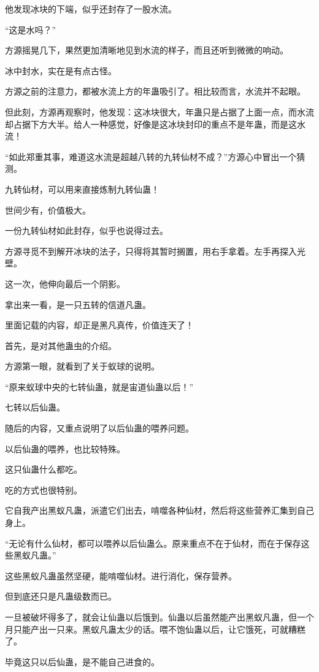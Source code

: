 \begin{this_body}
他发现冰块的下端，似乎还封存了一股水流。

“这是水吗？”

方源摇晃几下，果然更加清晰地见到水流的样子，而且还听到微微的响动。

冰中封水，实在是有点古怪。

方源之前的注意力，都被水流上方的年蛊吸引了。相比较而言，水流并不起眼。

但此刻，方源再观察时，他发现：这冰块很大，年蛊只是占据了上面一点，而水流却占据下方大半。给人一种感觉，好像是这冰块封印的重点不是年蛊，而是这水流！

“如此郑重其事，难道这水流是超越八转的九转仙材不成？”方源心中冒出一个猜测。

九转仙材，可以用来直接炼制九转仙蛊！

世间少有，价值极大。

一份九转仙材如此封存，似乎也说得过去。

方源寻觅不到解开冰块的法子，只得将其暂时搁置，用右手拿着。左手再探入光壁。

这一次，他伸向最后一个阴影。

拿出来一看，是一只五转的信道凡蛊。

里面记载的内容，却正是黑凡真传，价值连天了！

首先，是对其他蛊虫的介绍。

方源第一眼，就看到了关于蚁球的说明。

“原来蚁球中央的七转仙蛊，就是宙道仙蛊以后！”

七转以后仙蛊。

随后的内容，又重点说明了以后仙蛊的喂养问题。

以后仙蛊的喂养，也比较特殊。

这只仙蛊什么都吃。

吃的方式也很特别。

它自我产出黑蚁凡蛊，派遣它们出去，啃噬各种仙材，然后将这些营养汇集到自己身上。

“无论有什么仙材，都可以喂养以后仙蛊么。原来重点不在于仙材，而在于保存这些黑蚁凡蛊。”

这些黑蚁凡蛊虽然坚硬，能啃噬仙材。进行消化，保存营养。

但到底还只是凡蛊级数而已。

一旦被破坏得多了，就会让仙蛊以后饿到。仙蛊以后虽然能产出黑蚁凡蛊，但一个月只能产出一只来。黑蚁凡蛊太少的话。喂不饱仙蛊以后，让它饿死，可就糟糕了。

毕竟这只以后仙蛊，是不能自己进食的。


\end{this_body}
